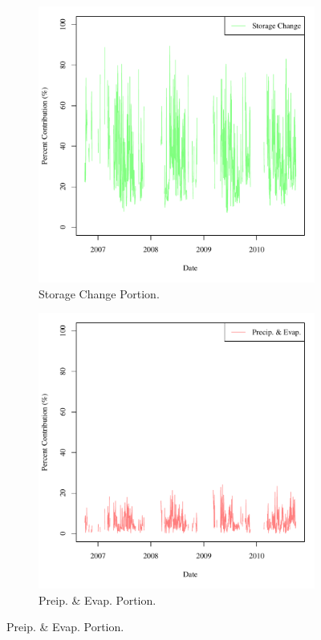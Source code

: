 \begin{linenumbers}
\begin{figure}[htbp]
\begin{subfigure}{0.5\textwidth}
		\includegraphics[width=0.9\linewidth]{"Figures/Results_USR/M Water Contrib 3"}
		\caption{Storage Change Portion.}
		\label{sub:USRWStore}
	\end{subfigure}
	\begin{subfigure}{0.5\textwidth}
		\centering
		\includegraphics[width=0.9\linewidth]{"Figures/Results_USR/M Water Contrib 2"}
		\caption{Preip. \& Evap. Portion.}

\end{subfigure}
\end{figure}
\end{linenumbers}
